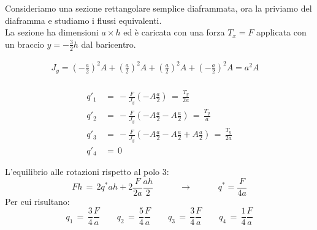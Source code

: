 \begin{esempioBox}
    Consideriamo una sezione rettangolare semplice diaframmata, ora la priviamo del diaframma e studiamo i flussi equivalenti.\\
    La sezione ha dimensioni $a\times h$ ed è caricata con una forza $T_x=F$ applicata con un braccio $y=-\frac{3}{2}h$ dal baricentro.

    \begin{align*}
        J_y = \left(-\frac{a}{2}\right)^2A +\left(\frac{a}{2}\right)^2A+ \left(\frac{a}{2}\right)^2A +\left(-\frac{a}{2}\right)^2A = a^2A\quad\\
    \end{align*}

    \begin{align*}
         q'_1 \,&= \,  -\frac{F}{J_y}\left( -A\frac{a}{2} \right) \,=\, \frac{T_y}{2a}\\
          q'_2 \,&= \, -\frac{F}{J_y}\left( -A\frac{a}{2}-A\frac{a}{2} \right) \,=\, \frac{T_y}{a}\\
           q'_3 \,&= \,  -\frac{F}{J_y}\left( -A\frac{a}{2}-A\frac{a}{2}+A\frac{a}{2} \right) \,=\, \frac{T_y}{2a}\\
            q'_4 \,&= \, 0
    \end{align*}

    L'equilibrio alle rotazioni rispetto al polo 3:
    \begin{equation*}
        Fh\,=\,2q^*ah+2\frac{F}{2a}\frac{ah}{2}   \quad\quad\quad\rightarrow\quad\quad\quad q^*=\frac{F}{4a}
    \end{equation*}
    Per cui risultano:
    \begin{equation*}
        q_1 \,=\, \frac{3}{4}\frac{F}{a} \quad \quad  
         q_2 \,=\, \frac{5}{4}\frac{F}{a} \quad \quad  
          q_3 \,=\, \frac{3}{4}\frac{F}{a} \quad \quad  
           q_4 \,=\, \frac{1}{4}\frac{F}{a} 
    \end{equation*}


\end{esempioBox}
